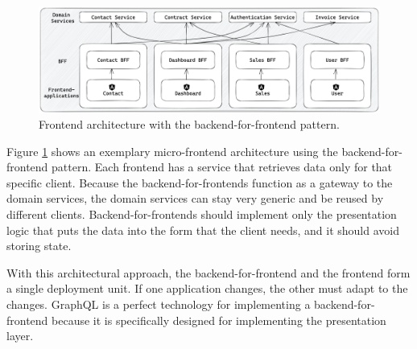 \ifshowImages
\begin{figure}[H]
    \centering
    \includegraphics[width=1\linewidth]{images/background/micro-frontends/bff-architecture.png}
    \caption{Frontend architecture with the backend-for-frontend pattern.}\label{fig:background:micro-frontend:bff-architecture}
\end{figure}
\fi

\noindent Figure \ref{fig:background:micro-frontend:bff-architecture} shows an exemplary micro-frontend architecture using the backend-for-frontend pattern. Each frontend has a service that retrieves data only for that specific client. Because the backend-for-frontends function as a gateway to the domain services, the domain services can stay very generic and be reused by different clients. Backend-for-frontends should implement only the presentation logic that puts the data into the form that the client needs, and it should avoid storing state. \cite{misc:2019:leitner:background:micro-frontends:backend-for-frontends}

\bigskip

\noindent With this architectural approach, the backend-for-frontend and the frontend form a single deployment unit. If one application changes, the other must adapt to the changes. GraphQL is a perfect technology for implementing a backend-for-frontend because it is specifically designed for implementing the presentation layer.
